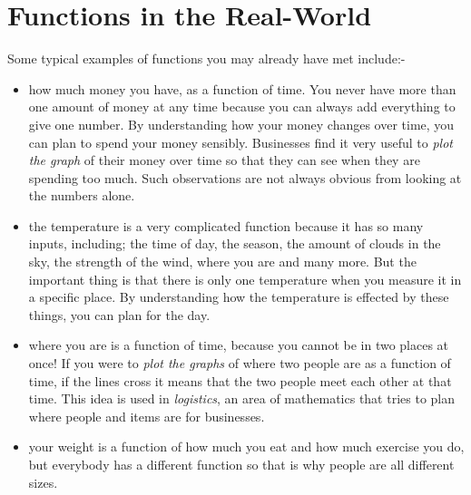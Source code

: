             \section{ Functions in the Real-World}
            \nopagebreak
 \label{m39337*id232071}Some typical examples of functions you may already have met
include:-\par 
      \label{m39337*id232074}\begin{itemize}[noitemsep]
            \label{m39337*uid1}\item how much money you have, as a function of time. You never have more than one amount of money at any time because you can always add everything to give one number. By understanding how your money changes over time, you can plan to spend your money sensibly. Businesses find it very useful to \textsl{plot the graph} of their money over time so that they can see when they are spending too much. Such observations are not always obvious from looking at the numbers alone.
\label{m39337*uid2}\item the temperature is a very complicated function because it has so many inputs, including; the time of day, the season, the amount of clouds in the sky, the strength of the wind, where you are and many more. But the important thing is that there is only one temperature when you measure it in a specific place. By understanding how the temperature is effected by these things, you can plan
for the day.
\label{m39337*uid3}\item where you are is a function of time, because you cannot be in two places at once! If you were to \textsl{plot the graphs} of where two people are as a function of time, if the lines cross it means that the two people meet each other at that time. This idea is used in \textsl{logistics}, an area of mathematics that tries to plan where people and items are for businesses.
\label{m39337*uid4}\item your weight is a function of how much you eat and how much exercise you do, but everybody has a different function so that is why people are all different sizes.
\end{itemize}
    \label{m39337*cid4}
